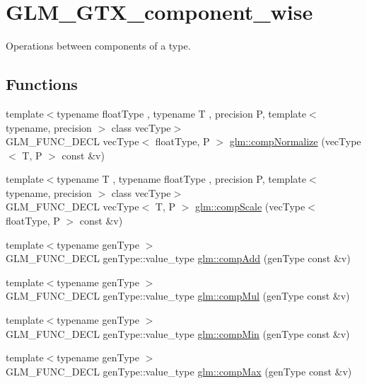 \hypertarget{group__gtx__component__wise}{}\section{G\+L\+M\+\_\+\+G\+T\+X\+\_\+component\+\_\+wise}
\label{group__gtx__component__wise}


Operations between components of a type.  


\subsection*{Functions}
\begin{DoxyCompactItemize}
\item 
{\footnotesize template$<$typename float\+Type , typename T , precision P, template$<$ typename, precision $>$ class vec\+Type$>$ }\\G\+L\+M\+\_\+\+F\+U\+N\+C\+\_\+\+D\+E\+CL vec\+Type$<$ float\+Type, P $>$ \hyperlink{group__gtx__component__wise_gaeb34fdf090d2d4da9babcdfec267f09e}{glm\+::comp\+Normalize} (vec\+Type$<$ T, P $>$ const \&v)
\item 
{\footnotesize template$<$typename T , typename float\+Type , precision P, template$<$ typename, precision $>$ class vec\+Type$>$ }\\G\+L\+M\+\_\+\+F\+U\+N\+C\+\_\+\+D\+E\+CL vec\+Type$<$ T, P $>$ \hyperlink{group__gtx__component__wise_gaea99a3271016bfd331d9fa7587f3db37}{glm\+::comp\+Scale} (vec\+Type$<$ float\+Type, P $>$ const \&v)
\item 
{\footnotesize template$<$typename gen\+Type $>$ }\\G\+L\+M\+\_\+\+F\+U\+N\+C\+\_\+\+D\+E\+CL gen\+Type\+::value\+\_\+type \hyperlink{group__gtx__component__wise_gaf71833350e15e74d31cbf8a3e7f27051}{glm\+::comp\+Add} (gen\+Type const \&v)
\item 
{\footnotesize template$<$typename gen\+Type $>$ }\\G\+L\+M\+\_\+\+F\+U\+N\+C\+\_\+\+D\+E\+CL gen\+Type\+::value\+\_\+type \hyperlink{group__gtx__component__wise_gae8ab88024197202c9479d33bdc5a8a5d}{glm\+::comp\+Mul} (gen\+Type const \&v)
\item 
{\footnotesize template$<$typename gen\+Type $>$ }\\G\+L\+M\+\_\+\+F\+U\+N\+C\+\_\+\+D\+E\+CL gen\+Type\+::value\+\_\+type \hyperlink{group__gtx__component__wise_gab5d0832b5c7bb01b8d7395973bfb1425}{glm\+::comp\+Min} (gen\+Type const \&v)
\item 
{\footnotesize template$<$typename gen\+Type $>$ }\\G\+L\+M\+\_\+\+F\+U\+N\+C\+\_\+\+D\+E\+CL gen\+Type\+::value\+\_\+type \hyperlink{group__gtx__component__wise_gabfa4bb19298c8c73d4217ba759c496b6}{glm\+::comp\+Max} (gen\+Type const \&v)
\end{DoxyCompactItemize}


